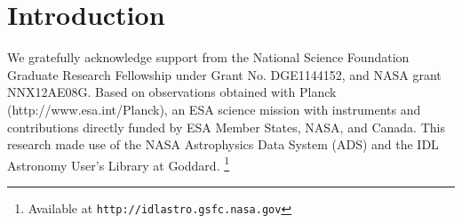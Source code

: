 \documentclass{emulateapj}
\begin{document}

\section{Introduction}
We gratefully acknowledge support from the National Science Foundation Graduate
Research Fellowship under Grant No. DGE1144152, and NASA grant NNX12AE08G. 
Based on observations obtained with Planck (http://www.esa.int/Planck), an ESA 
science mission with instruments and contributions directly funded by ESA 
Member States, NASA, and Canada. This research made use of the NASA 
Astrophysics Data System (ADS) and the IDL Astronomy User's Library at Goddard.
\footnote{Available at \texttt{http://idlastro.gsfc.nasa.gov}}



\end{document}
